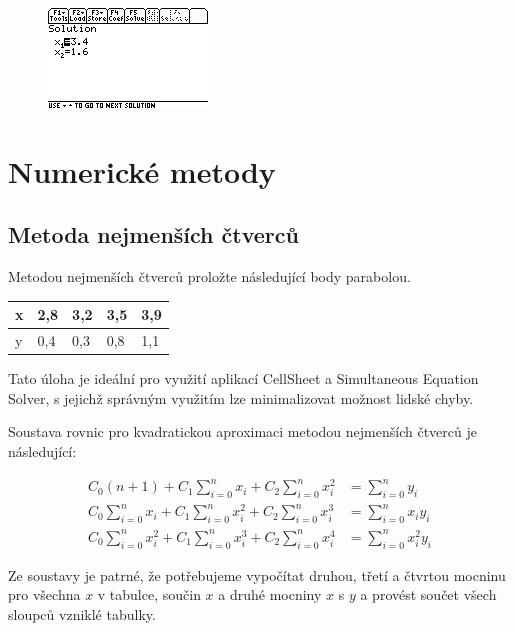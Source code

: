\documentclass[10pt,a4paper,float]{article}
\begin{document}
\begin{figure}[H]
	\centering
	\includegraphics[width=.5\textwidth]{img/SYSEQ3}
\end{figure}

\pagebreak

\section{Numerické metody}
\label{sec:nummetody}
\subsection{Metoda nejmenších čtverců}
\label{ssec:ctverce}
Metodou nejmenších čtverců proložte následující body parabolou.

\begin{table}[H]
	\centering
	\begin{tabular}{l|l|l|l|l}
		x & 2,8 & 3,2 & 3,5 & 3,9 \\ \hline
		y & 0,4 & 0,3 & 0,8 & 1,1
	\end{tabular}
\end{table}

Tato úloha je ideální pro využití aplikací CellSheet a Simultaneous Equation Solver, s jejichž správným využitím lze minimalizovat možnost lidské chyby.

Soustava rovnic pro kvadratickou aproximaci metodou nejmenších čtverců je následující:

\begin{align*}
	C_0 (n + 1) + C_1 \sum_{i=0}^{n} x_i + C_2 \sum_{i=0}^{n} x_i^2 &= \sum_{i=0}^{n} y_i \\
	C_0 \sum_{i=0}^{n} x_i + C_1 \sum_{i=0}^{n} x_i^2 + C_2 \sum_{i=0}^{n} x_i^3 &= \sum_{i=0}^{n} x_i y_i \\
	C_0 \sum_{i=0}^{n} x_i^2 + C_1 \sum_{i=0}^{n} x_i^3 + C_2 \sum_{i=0}^{n} x_i^4 &= \sum_{i=0}^{n} x_i^2 y_i
\end{align*}

Ze soustavy je patrné, že potřebujeme vypočítat druhou, třetí a čtvrtou mocninu pro všechna $x$ v tabulce, součin $x$ a druhé mocniny $x$ s $y$ a provést součet všech sloupců vzniklé tabulky.
\end{document}
